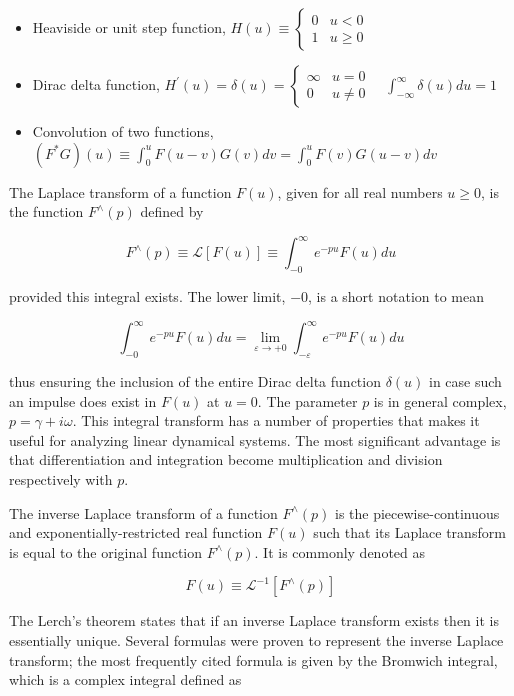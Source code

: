 \documentclass[10pt]{article}
\begin{document}
\begin{itemize}
  \item Heaviside or unit step function, $H(u) \equiv \begin{cases}0 & u<0 \\ 1 & u \geq 0\end{cases}$

  \item Dirac delta function, $H^{\prime}(u)=\delta(u)=\left\{\begin{array}{ll}\infty & u=0 \\ 0 & u \neq 0\end{array} \quad \int_{-\infty}^{\infty} \delta(u) d u=1\right.$

  \item Convolution of two functions, $\left(F^{*} G\right)(u) \equiv \int_{0}^{u} F(u-v) G(v) d v=\int_{0}^{u} F(v) G(u-v) d v$

\end{itemize}

The Laplace transform of a function $F(u)$, given for all real numbers $u \geq 0$, is the function $F^{\wedge}(p)$ defined by

$$
F^{\wedge}(p) \equiv \mathcal{L}[F(u)] \equiv \int_{-0}^{\infty} e^{-p u} F(u) d u
$$

provided this integral exists. The lower limit, $-0$, is a short notation to mean

$$
\int_{-0}^{\infty} e^{-p u} F(u) d u=\lim _{\varepsilon \rightarrow+0} \int_{-\varepsilon}^{\infty} e^{-p u} F(u) d u
$$

thus ensuring the inclusion of the entire Dirac delta function $\delta(u)$ in case such an impulse does exist in $F(u)$ at $u=0$. The parameter $p$ is in general complex, $p=\gamma+i \omega$. This integral transform has a number of properties that makes it useful for analyzing linear dynamical systems. The most significant advantage is that differentiation and integration become multiplication and division respectively with $p$.

The inverse Laplace transform of a function $F^{\wedge}(p)$ is the piecewise-continuous and exponentially-restricted real function $F(u)$ such that its Laplace transform is equal to the original function $F^{\wedge}(p)$. It is commonly denoted as

$$
F(u) \equiv \mathcal{L}^{-1}\left[F^{\wedge}(p)\right]
$$

The Lerch's theorem states that if an inverse Laplace transform exists then it is essentially unique. Several formulas were proven to represent the inverse Laplace transform; the most frequently cited formula is given by the Bromwich integral, which is a complex integral defined as
\end{document}
